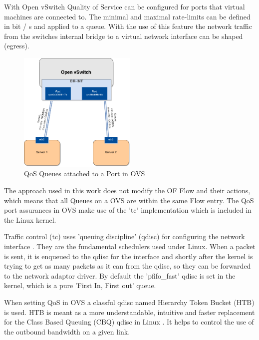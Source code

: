 With Open vSwitch Quality of Service can be configured for ports that virtual machines are connected to. The minimal and maximal rate-limits can be defined in bit / s and applied to a queue. With the use of this feature the network traffic from the switches internal bridge to a virtual network interface can be shaped (egress).

\begin{figure}[H]
\centering
\includegraphics[width=0.5\textwidth]{images/fundamentals/openvswitch_qos-queues.png}
\caption{QoS Queues attached to a Port in OVS}
\end{figure}

The approach used in this work does not modify the OF Flow and their actions, which means that all Queues on a OVS are within the same Flow entry. The QoS port assurances in OVS make use of the 'tc' implementation which is included in the Linux kernel.



Traffic control (tc) uses 'queuing discipline' (qdisc) for configuring the network interface \cite{tc-manual}. They are the fundamental schedulers used under Linux. When a packet is sent, it is enqueued to the qdisc for the interface and shortly after the kernel is trying to get as many packets as it can from the qdisc, so they can be forwarded to the network adaptor driver. By default the 'pfifo\_fast' qdisc is set in the kernel, which is a pure 'First In, First out' queue.

When setting QoS in OVS a classful qdisc named Hierarchy Token Bucket (HTB) is used. HTB is meant as a more understandable, intuitive and faster replacement for the Class Based Queuing (CBQ) qdisc in Linux \cite{htb-guide}. It helps to control the use of the outbound bandwidth on a given link. 

